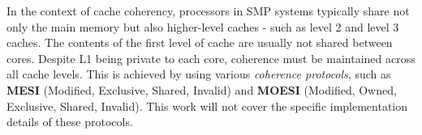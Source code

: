 In the context of cache coherency, processors in SMP systems typically share not only the main memory but also higher-level caches - such as level 2 and level 3 caches.
The contents of the first level of cache are usually not shared between cores. Despite L1 being private to each core, coherence must be maintained across all cache levels.
This is achieved by using various \textit{coherence protocols}, such as \textbf{MESI} (Modified, Exclusive, Shared, Invalid) and \textbf{MOESI} (Modified, Owned, Exclusive, Shared, Invalid).
This work will not cover the specific implementation details of these protocols.

